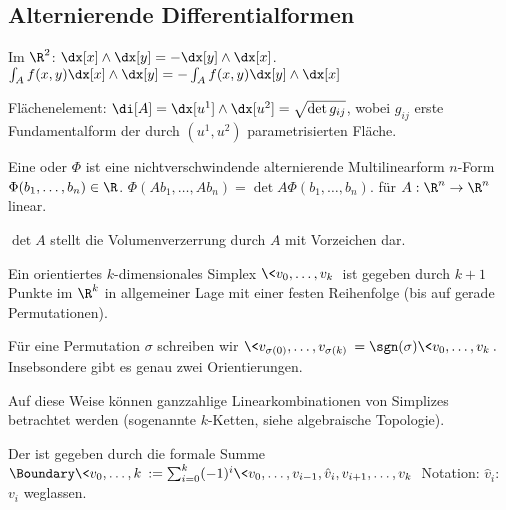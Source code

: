\subsection{Alternierende Differentialformen}


Im $\R^2$: $\dx[x] \wedge \dx[y] = -\dx[y] \wedge \dx[x]$.
\begin{math}
    \int_A f(x,y) \dx[x] \wedge \dx[y]
    = - \int_A f(x,y) \dx[y] \wedge \dx[x]
\end{math}

Flächenelement: $\di[A] = \dx[u^1] \wedge \dx[u^2] =  \sqrt{\det{g_{ij}}}$, wobei $g_{ij}$ erste Fundamentalform der durch $(u^1, u^2)$ parametrisierten Fläche.

\begin{df}
    Eine  oder  $\Phi$ ist eine nichtverschwindende alternierende Multilinearform $n$-Form $\Phi(b_1, \dotsc, b_n) \in \R$.
    \begin{math}
        \Phi(A b_1, \dotsc, A b_n)
        = \det A \Phi(b_1, \dotsc, b_n).
    \end{math}
    für $A : \R^n \to \R^n$ linear.
\end{df}

$\det A$ stellt die Volumenverzerrung durch $A$ mit Vorzeichen dar.

\begin{df}
    Ein orientiertes $k$-dimensionales Simplex $\<v_0, \dotsc, v_k\>$ ist gegeben durch $k + 1$ Punkte im $\R^k$ in allgemeiner Lage mit einer festen Reihenfolge (bis auf gerade Permutationen).

    Für eine Permutation $\sigma$ schreiben wir
    \begin{math}
        \<v_{\sigma(0)}, \dotsc, v_{\sigma(k)}\> = \sgn(\sigma) \<v_0, \dotsc, v_k\>.
    \end{math}
    Insebsondere gibt es genau zwei Orientierungen.
\end{df}

\begin{note}
    Auf diese Weise können ganzzahlige Linearkombinationen von Simplizes betrachtet werden (sogenannte $k$-Ketten, siehe algebraische Topologie).
\end{note}

Der  ist gegeben durch die formale Summe
\begin{math}
    \Boundary \<v_0, \dotsc, k\>
    := \sum_{i=0}^k (-1)^i \<v_0, \dotsc, v_{i-1}, \hat v_i, v_{i+1}, \dotsc, v_k\>
\end{math}
Notation: $\hat v_i$: $v_i$ weglassen.


